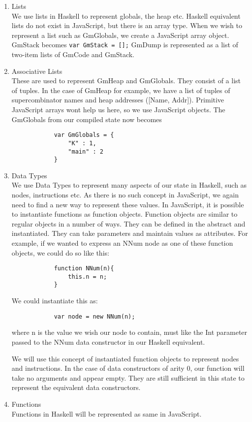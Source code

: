 \begin{enumerate}
	\item Lists\\
		  We use lists in Haskell to represent globals, the
		  heap etc. Haskell equivalent lists do not exist
		  in JavaScript, but there is an array type. When 
		  we wish to represent a list such as GmGlobals, we
		  create a JavaScript array object. GmStack becomes
		  \verb!var GmStack = [];!
		  GmDump is represented as a list of two-item lists 
		  of GmCode and GmStack.
	\item Associative Lists\\
		  These are used to represent GmHeap and GmGlobals.
		  They consist of a list of tuples. In the case of
		  GmHeap for example, we have a list of tuples of
		  supercombinator names and heap addresses ([Name,
		  Addr]). Primitive JavaScript arrays wont help
		  us here, so we use JavaScript objects. The 
		  GmGlobals from our compiled state now becomes 

		  \begin{verbatim}
		  	var GmGlobals = {
		  		"K" : 1,
		  		"main" : 2
		  	}
		  \end{verbatim}

	\item Data Types \\
		  We use Data Types to represent many aspects of 
		  our state in Haskell, such as nodes, instructions
		  etc. As there is no such concept in JavaScript, 
		  we again need to find a new way to represent these
		  values. In JavaScript, it is possible to instantiate
		  functions as function objects. Function objects are
		  similar to regular objects in a number of ways. They
		  can be defined in the abstract and instantiated. They
		  can take parameters and maintain values as attributes.
		  For example, if we wanted to express an NNum node as
		  one of these function objects, we could do so like
		  this:

		  \begin{verbatim}
		  	function NNum(n){
		  		this.n = n;
		  	}
		  \end{verbatim}

		  We could instantiate this as:

		  \begin{verbatim}
		  	var node = new NNum(n);
		  \end{verbatim}

		  where n is the value we wish our node to contain, 
		  must like the Int parameter passed to the NNum data
		  constructor in our Haskell equivalent. 

		  We will use this concept of instantiated function
		  objects to represent nodes and instructions. In the
		  case of data constructors of arity 0, our function
		  will take no arguments and appear empty. They are
		  still sufficient in this state to represent the
		  equivalent data constructors.

	\item Functions \\ 
		  Functions in Haskell will be represented as same in
		  JavaScript. 
\end{enumerate}

